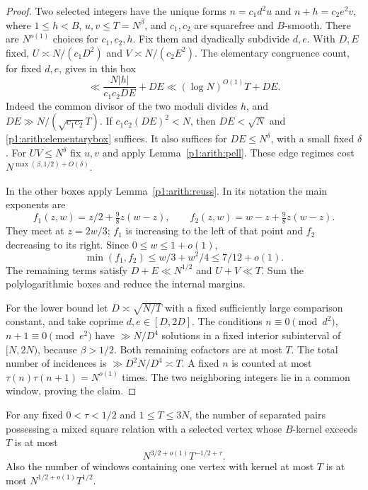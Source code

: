 \begin{proof}
Two selected integers have the unique forms
$n=c_1d^2u$ and $n+h=c_2e^2v$, where $1\leq h<B$,
$u,v\leq T=N^\beta$, and $c_1,c_2$ are squarefree and $B$-smooth.
There are $N^{o(1)}$ choices for $c_1,c_2,h$.
Fix them and dyadically subdivide $d,e$.  With $D,E$ fixed,
$U\asymp N/(c_1D^2)$ and $V\asymp N/(c_2E^2)$.
The elementary congruence count, for fixed $d,e$, gives in this box
\begin{equation}\label{p1:arith:elementarybox}
 \ll\frac{N|h|}{c_1c_2DE}+DE
 \ll (\log N)^{O(1)}T+DE.
\end{equation}
Indeed the common divisor of the two moduli divides $h$, and
$DE\gg N/(\sqrt{c_1c_2}T)$.
If $c_1c_2(DE)^2<N$, then $DE<\sqrt N$ and
\eqref{p1:arith:elementarybox} suffices.  It also suffices for
$DE\leq N^\delta$, with a small fixed $\delta$.
For $UV\leq N^\delta$ fix $u,v$ and apply
Lemma~\ref{p1:arith:pell}.  These edge regimes cost
$N^{\max(\beta,1/2)+O(\delta)}$.

In the other boxes apply Lemma~\ref{p1:arith:reuss}.  In its notation the
main exponents are
\[
 f_1(z,w)=z/2+\tfrac98z(w-z),\qquad
 f_2(z,w)=w-z+\tfrac98z(w-z).
\]
They meet at $z=2w/3$; $f_1$ is increasing to the left of that point and
$f_2$ decreasing to its right.  Since $0\leq w\leq1+o(1)$,
\[
 \min(f_1,f_2)\leq w/3+w^2/4\leq7/12+o(1).
\]
The remaining terms satisfy $D+E\ll N^{1/2}$ and $U+V\ll T$.
Sum the polylogarithmic boxes and reduce the internal margins.

For the lower bound let $D\asymp\sqrt{N/T}$ with a fixed sufficiently
large comparison constant, and take coprime $d,e\in[D,2D]$.
The conditions $n\equiv0\pmod{d^2}$, $n+1\equiv0\pmod{e^2}$ have
$\gg N/D^4$ solutions in a fixed interior subinterval of $[N,2N)$,
because $\beta>1/2$.  Both remaining cofactors are at most $T$.
The total number of incidences is $\gg D^2N/D^4\asymp T$.
A fixed $n$ is counted at most $\tau(n)\tau(n+1)=N^{o(1)}$ times.
The two neighboring integers lie in a common window, proving the claim.
\end{proof}

\begin{lemma}\label{p1:arith:anchor}
For any fixed $0<\tau<1/2$ and $1\leq T\leq3N$, the number of separated
pairs possessing a mixed square relation with a selected vertex whose
$B$-kernel exceeds $T$ is at most
\[
 N^{3/2+o(1)}T^{-1/2+\tau}.
\]
Also the number of windows containing one vertex with kernel at most $T$
is at most $N^{1/2+o(1)}T^{1/2}$.
\end{lemma}


